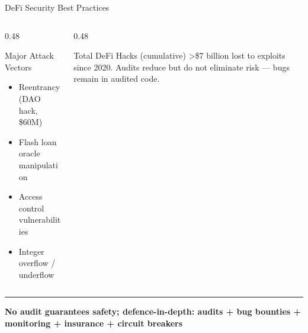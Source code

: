 \documentclass[8pt,aspectratio=169]{beamer}
\newcommand{\bottomnote}[1]{\vfill\vspace{-2mm}\textcolor{mllavender2}{\rule{\textwidth}{0.4pt}}\vspace{1mm}\footnotesize\textbf{#1}}
\begin{document}
\begin{frame}{DeFi Security Best Practices}
\begin{center}
\begin{tikzpicture}
  \end{tikzpicture}
  \end{center}
  \vspace{1mm}
  \begin{columns}[T]
    \begin{column}{0.48\textwidth}
      \begin{alertblock}{Major Attack Vectors}
        \begin{itemize}\setlength\itemsep{1pt}
          \item Reentrancy (DAO hack, \$60M)
          \item Flash loan oracle manipulation
          \item Access control vulnerabilities
          \item Integer overflow / underflow
        \end{itemize}
      \end{alertblock}
    \end{column}
    \begin{column}{0.48\textwidth}
      \begin{block}{Total DeFi Hacks (cumulative)}
        \textgreater\$7 billion lost to exploits since 2020.
        Audits reduce but do not eliminate risk --- bugs remain
        in audited code.
      \end{block}
    \end{column}
  \end{columns}
  \bottomnote{No audit guarantees safety; defence-in-depth: audits + bug bounties + monitoring + insurance + circuit breakers}
\end{frame}
\end{document}
